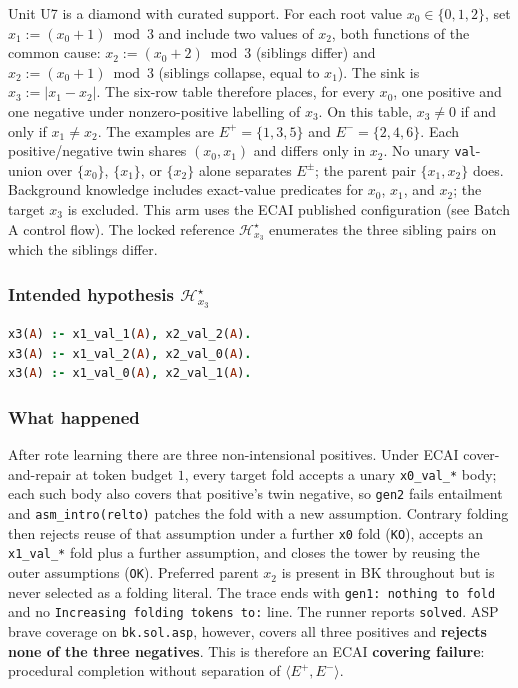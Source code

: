 \documentclass[11pt]{article}
\begin{document}
Unit U7 is a diamond with curated support. For each root value \(x_0\in\{0,1,2\}\), set \(x_1:=(x_0+1)\bmod 3\) and include two values of \(x_2\), both functions of the common cause: \(x_2:=(x_0+2)\bmod 3\) (siblings differ) and \(x_2:=(x_0+1)\bmod 3\) (siblings collapse, equal to \(x_1\)). The sink is \(x_3:=|x_1-x_2|\). The six-row table therefore places, for every \(x_0\), one positive and one negative under nonzero-positive labelling of \(x_3\). On this table, \(x_3\neq 0\) if and only if \(x_1\neq x_2\). The examples are \(E^+=\{1,3,5\}\) and \(E^-=\{2,4,6\}\). Each positive/negative twin shares \((x_0,x_1)\) and differs only in \(x_2\). No unary \texttt{val}-union over \(\{x_0\}\), \(\{x_1\}\), or \(\{x_2\}\) alone separates \(E^\pm\); the parent pair \(\{x_1,x_2\}\) does. Background knowledge includes exact-value predicates for \(x_0\), \(x_1\), and \(x_2\); the target \(x_3\) is excluded. This arm uses the ECAI published configuration (see Batch A control flow). The locked reference \(\mathcal{H}_{x_3}^\star\) enumerates the three sibling pairs on which the siblings differ.

\subsubsection{\texorpdfstring{Intended hypothesis \(\mathcal{H}_{x_3}^\star\)}{Intended hypothesis H-star(x3)}}

\begin{lstlisting}[style=logic,language=Prolog]
x3(A) :- x1_val_1(A), x2_val_2(A).
x3(A) :- x1_val_2(A), x2_val_0(A).
x3(A) :- x1_val_0(A), x2_val_1(A).
\end{lstlisting}

\subsubsection{What happened}

After rote learning there are three non-intensional positives. Under ECAI cover-and-repair at token budget \(1\), every target fold accepts a unary \texttt{x0\_val\_*} body; each such body also covers that positive's twin negative, so \texttt{gen2} fails entailment and \texttt{asm\_intro(relto)} patches the fold with a new assumption. Contrary folding then rejects reuse of that assumption under a further \texttt{x0} fold (\texttt{KO}), accepts an \texttt{x1\_val\_*} fold plus a further assumption, and closes the tower by reusing the outer assumptions (\texttt{OK}). Preferred parent \(x_2\) is present in BK throughout but is never selected as a folding literal. The trace ends with \texttt{gen1: nothing to fold} and no \texttt{Increasing folding tokens to:} line. The runner reports \texttt{solved}. ASP brave coverage on \texttt{bk.sol.asp}, however, covers all three positives and \textbf{rejects none of the three negatives}. This is therefore an ECAI \textbf{covering failure}: procedural completion without separation of \(\langle E^+,E^-\rangle\).
\end{document}
